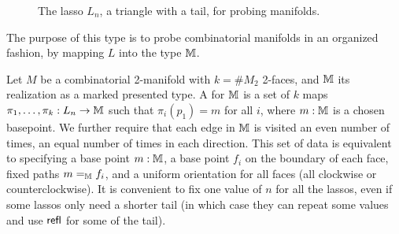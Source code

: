 \begin{figure}[h]
\centering
{}
\caption{The lasso \( L_n \), a triangle with a tail, for probing manifolds.}
\label{fig:lasso}
\end{figure}

The purpose of this type is to probe combinatorial manifolds in an organized fashion, by mapping \( L \) into the type \( \mathbb{M} \).

\begin{mydef}
\label{def:face_enumerator}
Let \( M \) be a combinatorial 2-manifold with \( k=\#M_2 \) 2-faces, and \( \mathbb{M} \) its realization as a marked presented type. A  for \( \mathbb{M} \) is a set of \( k \) maps \( \pi_1,\ldots,\pi_k:L_n\to \mathbb{M} \) such that \( \pi_i(p_1)=m \) for all \( i \), where \( m:\mathbb{M} \) is a chosen basepoint. We further require that each edge in \( \mathbb{M} \) is visited an even number of times, an equal number of times in each direction. This set of data is equivalent to specifying a base point \( m:\mathbb{M} \), a base point \( f_i \) on the boundary of each face, fixed paths \( m=_{\mathbb{M}} f_i \), and a uniform orientation for all faces (all clockwise or counterclockwise). It is convenient to fix one value of \( n \) for all the lassos, even if some lassos only need a shorter tail (in which case they can repeat some values and use \( \mathsf{refl} \) for some of the tail).
\end{mydef}

